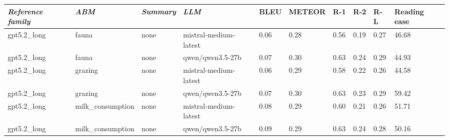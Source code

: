 \begin{tabular}{|l|l|l|l|l|l|l|l|l|l|}
\hline
\textit{\textbf{Reference family}} & \textit{\textbf{ABM}} & \textit{\textbf{Summary}} & \textit{\textbf{LLM}} & BLEU & METEOR & R-1 & R-2 & R-L & Reading ease \\
 \hline
 gpt5.2\_long & fauna & none & mistral-medium-latest & 0.06 & 0.28 & 0.56 & 0.19 & 0.27 & 46.68 \\
 \hline
 gpt5.2\_long & fauna & none & qwen/qwen3.5-27b & 0.07 & 0.30 & 0.63 & 0.24 & 0.29 & 44.93 \\
 \hline
 gpt5.2\_long & grazing & none & mistral-medium-latest & 0.06 & 0.29 & 0.58 & 0.22 & 0.26 & 44.58 \\
 \hline
 gpt5.2\_long & grazing & none & qwen/qwen3.5-27b & 0.07 & 0.30 & 0.63 & 0.23 & 0.29 & 59.42 \\
 \hline
 gpt5.2\_long & milk\_consumption & none & mistral-medium-latest & 0.08 & 0.29 & 0.60 & 0.21 & 0.26 & 51.71 \\
 \hline
 gpt5.2\_long & milk\_consumption & none & qwen/qwen3.5-27b & 0.09 & 0.29 & 0.63 & 0.24 & 0.28 & 50.16 \\
\hline
\end{tabular}
